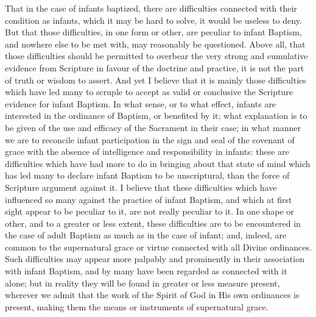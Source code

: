 \documentclass[]{book}
\begin{document}
That in the case of infants baptized, there are difficulties connected with their condition as infants, which it may be hard to solve, it would be useless to deny. But that those difficulties, in one form or other, are peculiar to infant Baptism, and nowhere else to be met with, may reasonably be questioned. Above all, that those difficulties should be permitted to overbear the very strong and cumulative evidence from Scripture in favour of the doctrine and practice, it is not the part of truth or wisdom to assert. And yet I believe that it is mainly those difficulties which have led many to scruple to accept as valid or conclusive the Scripture evidence for infant Baptism. In what sense, or to what effect, infants are interested in the ordinance of Baptism, or benefited by it; what explanation is to be given of the use and efficacy of the Sacrament in their case; in what manner we are to reconcile infant participation in the sign and seal of the covenant of grace with the absence of intelligence and responsibility in infants: these are difficulties which have had more to do in bringing about that state of mind which has led many to declare infant Baptism to be unscriptural, than the force of Scripture argument against it. I believe that these difficulties which have influenced so many against the practice of infant Baptism, and which at first sight appear to be peculiar to it, are not really peculiar to it. In one shape or other, and to a greater or less extent, these difficulties are to be encountered in the case of adult Baptism as much as in the case of infant; and, indeed, are common to the supernatural grace or virtue connected with all Divine ordinances. Such difficulties may appear more palpably and prominently in their association with infant Baptism, and by many have been regarded as connected with it alone; but in reality they will be found in greater or less measure present, wherever we admit that the work of the Spirit of God in His own ordinances is present, making them the means or instruments of supernatural grace.
\end{document}

